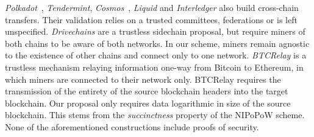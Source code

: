 \emph{Polkadot}~\cite{wood2016polkadot}, \emph{Tendermint},
\emph{Cosmos}~\cite{buchman2016tendermint}, \emph{Liquid} and \emph{Interledger}
also build cross-chain transfers. Their validation relies on a trusted
committees, federations or is left unspecified. \emph{Drivechains} are a
trustless sidechain proposal, but require miners of both chains to be aware of
both networks. In our scheme, miners remain agnostic to the existence of other
chains and connect only to one network. \emph{BTCRelay} is a trustless mechanism
relaying information one-way from Bitcoin to Ethereum, in which miners are
connected to their network only. BTCRelay requires the transmission of the
entirety of the source blockchain headers into the target blockchain. Our
proposal only requires data logarithmic in size of the source blockchain. This
stems from the \emph{succinctness} property of the NIPoPoW scheme. None of the
aforementioned constructions include proofs of security.
